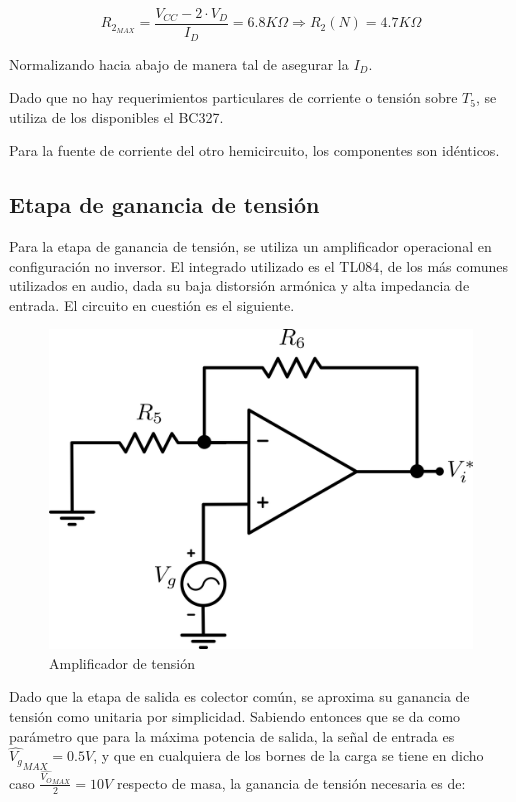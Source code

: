 \[
 R_{2_{MAX}} = \frac{V_{CC} - 2 \cdot V_D}{I_D} = 6.8K\Omega \Longrightarrow R_2(N) = 4.7K\Omega
\]

Normalizando hacia abajo de manera tal de asegurar la $I_D$.\par
Dado que no hay requerimientos particulares de corriente o tensión sobre $T_5$, se utiliza de los disponibles el BC327.\par
Para la fuente de corriente del otro hemicircuito, los componentes son idénticos.

\subsection{Etapa de ganancia de tensión}

Para la etapa de ganancia de tensión, se utiliza un amplificador operacional en configuración no inversor. El integrado utilizado es el TL084, de los más comunes utilizados en audio, dada su baja distorsión armónica y alta impedancia de entrada. El circuito en cuestión es el siguiente.

\begin{figure}[!ht]
\begin{centering}
\includegraphics[scale=0.5]{Imagenes/EtapaDeAV.png}
\par\end{centering}
\caption{Amplificador de tensión}
\end{figure}

Dado que la etapa de salida es colector común, se aproxima su ganancia de tensión como unitaria por simplicidad. Sabiendo entonces que se da como parámetro que para la máxima potencia de salida, la señal de entrada es $\hat{V_g}_{MAX} = 0.5V$, y que en cualquiera de los bornes de la carga se tiene en dicho caso $\frac{\hat{V_O}_{MAX}}{2} = 10V$ respecto de masa, la ganancia de tensión necesaria es de:

